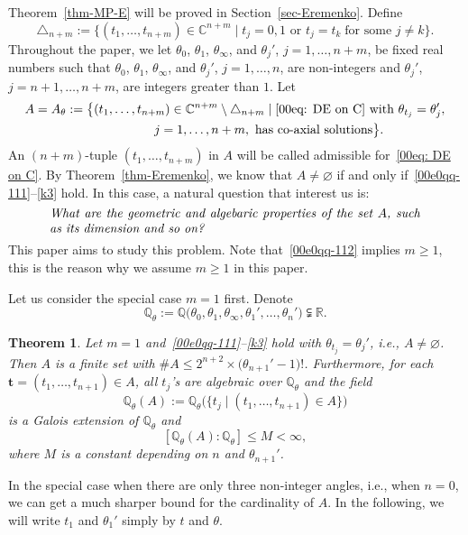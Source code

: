 \documentclass[pdftex]{sigma}
\numberwithin{equation}{section}
\newtheorem{Theorem}{Theorem}[section]
\def\Q{\mathbb Q}
\def\R{\mathbb R}
\begin{document}
Theorem~\ref{thm-MP-E} will be proved in Section~\ref{sec-Eremenko}.
Define
\[
 \triangle_{n+m}:=\bigl\{(t_1,\dots,t_{n+m})\in \mathbb{C}^{n+m}\mid
 t_j=0,1 \text{ or } t_j=t_k\;\text{for some $j\neq k$}\bigr\}.
\]
Throughout the paper, we let $\theta_0$, $\theta_1$,
$\theta_\infty$, and $\theta_j'$, $j=1,\dots,n+m$, be fixed real
numbers such that $\theta_0$, $\theta_1$, $\theta_\infty$, and
$\theta_j'$, $j=1,\dots,n$, are non-integers and $\theta_j'$,
$j=n+1,\dots,n+m$, are integers greater than $1$.
Let
\begin{gather}
 A=A_\theta:=\bigl\{(t_1,\dots,t_{n+m})\in \mathbb{C}^{n+m}\setminus
 \triangle_{n+m}\mid \text{\eqref{00eq: DE on C}
 with}\ \theta_{t_j}=\theta_j',
\nonumber\\ \hphantom{ A=A_\theta:=\{}{}
j=1,\dots,n+m, \
 \text{has co-axial solutions}\bigr\}.\label{eq: set A}
\end{gather}
An $(n+m)$-tuple $(t_1,\dots,t_{n+m})$ in $A$ will be called
admissible for~\eqref{00eq: DE on C}.
By Theorem~\ref{thm-Eremenko}, we know that $A\neq\varnothing$ if and
only if~\eqref{00e0qq-111}--\eqref{k3} hold. In this case, a natural
question that interest us is:
\[\parbox{\dimexpr\linewidth-5em}{\it
 What are the geometric and algebaric properties of the set $A$, such as its dimension and so on?
 }\]
This paper aims to study this problem. Note that~\eqref{00e0qq-112}
implies $m\geq 1$, this is the reason why we assume $m\geq 1$ in this paper.

Let us consider the special case $m=1$ first. Denote
\[
 \Q_{\theta}:=\Q\bigl(\theta_0,\theta_1,\theta_\infty,\theta_1',
 \dots,\theta_n'\bigr)\subsetneqq \R.
\]

\begin{Theorem}\label{00thm-2-2}
Let $m=1$ and~\eqref{00e0qq-111}--\eqref{k3} hold with
$\theta_{t_j}=\theta_j'$, i.e., $A\neq\varnothing$.
Then $A$ is a finite set with $\# A\leq
2^{n+2}\times\bigl(\theta_{n+1}'-1\bigr)!$. Furthermore, for each
$\boldsymbol t=(t_1,\dots,t_{n+1})\in A$, all $t_j$'s are algebraic
over $\Q_{\theta}$ and the field
\[\Q_\theta(A):=\Q_{\theta}\bigl(\bigl\{t_j \mid (t_1,\dots,t_{n+1})\in A\bigr\}\bigr)\]
is a Galois extension of $\Q_{\theta}$ and
\[[\Q_\theta(A) : \Q_\theta]\leq M<\infty,\]
where $M$ is a constant depending on $n$ and $\theta_{n+1}'$.
\end{Theorem}

In the special case when there are only three
non-integer angles, i.e., when $n=0$, we can get a much sharper bound
for the cardinality of $A$. In the following, we will write
$t_1$ and $\theta_1'$ simply by $t$ and $\theta$.
\end{document}
